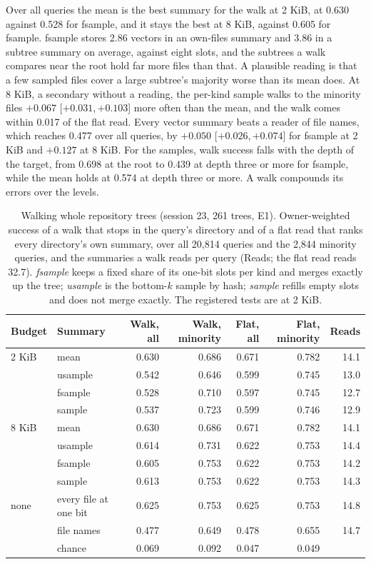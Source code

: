 \documentclass[11pt]{article}
\newcommand{\ci}[2]{[\ensuremath{#1},\,\ensuremath{#2}]}  %
\begin{document}
Over all queries the mean is the best summary for the walk at 2 KiB, at 0.630 against 0.528 for fsample, and it stays the best at 8 KiB, against 0.605 for fsample. fsample stores 2.86 vectors in an own-files summary and 3.86 in a subtree summary on average, against eight slots, and the subtrees a walk compares near the root hold far more files than that. A plausible reading is that a few sampled files cover a large subtree's majority worse than its mean does. At 8 KiB, a secondary without a reading, the per-kind sample walks to the minority files $+0.067$ \ci{+0.031}{+0.103} more often than the mean, and the walk comes within 0.017 of the flat read. Every vector summary beats a reader of file names, which reaches 0.477 over all queries, by $+0.050$ \ci{+0.026}{+0.074} for fsample at 2 KiB and $+0.127$ at 8 KiB. For the samples, walk success falls with the depth of the target, from 0.698 at the root to 0.439 at depth three or more for fsample, while the mean holds at 0.574 at depth three or more. A walk compounds its errors over the levels.

\begin{table}[t]
\centering\small
\caption{Walking whole repository trees (session 23, 261 trees, E1). Owner-weighted success of a walk that stops in the query's directory and of a flat read that ranks every directory's own summary, over all 20,814 queries and the 2,844 minority queries, and the summaries a walk reads per query (Reads; the flat read reads 32.7). \emph{fsample} keeps a fixed share of its one-bit slots per kind and merges exactly up the tree; \emph{usample} is the bottom-$k$ sample by hash; \emph{sample} refills empty slots and does not merge exactly. The registered tests are at 2 KiB.}
\label{tab:tree}
\setlength{\tabcolsep}{5pt}
\begin{tabular}{llrrrrr}
\toprule
Budget & Summary & Walk, all & Walk, minority & Flat, all & Flat, minority & Reads \\
\midrule
2 KiB & mean & 0.630 & 0.686 & 0.671 & 0.782 & 14.1 \\
 & usample & 0.542 & 0.646 & 0.599 & 0.745 & 13.0 \\
 & fsample & 0.528 & 0.710 & 0.597 & 0.745 & 12.7 \\
 & sample & 0.537 & 0.723 & 0.599 & 0.746 & 12.9 \\
8 KiB & mean & 0.630 & 0.686 & 0.671 & 0.782 & 14.1 \\
 & usample & 0.614 & 0.731 & 0.622 & 0.753 & 14.4 \\
 & fsample & 0.605 & 0.753 & 0.622 & 0.753 & 14.2 \\
 & sample & 0.613 & 0.753 & 0.622 & 0.753 & 14.3 \\
none & every file at one bit & 0.625 & 0.753 & 0.625 & 0.753 & 14.8 \\
 & file names & 0.477 & 0.649 & 0.478 & 0.655 & 14.7 \\
 & chance & 0.069 & 0.092 & 0.047 & 0.049 & \\
\bottomrule
\end{tabular}
\end{table}
\end{document}
